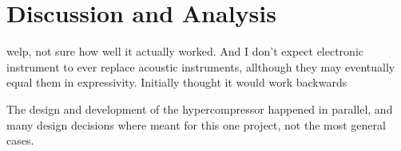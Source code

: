 \clearpage
\chapter{Discussion and Analysis}
\label{ch:analysis}

welp, not sure how well it actually worked. And I don't expect
electronic instrument to ever replace acoustic instruments, allthough
they may eventually equal them in expressivity. Initially
thought it would work backwards

The design and development of the hypercompressor happened in
parallel, and many design decisions where meant for this one project,
not the most general cases. 

